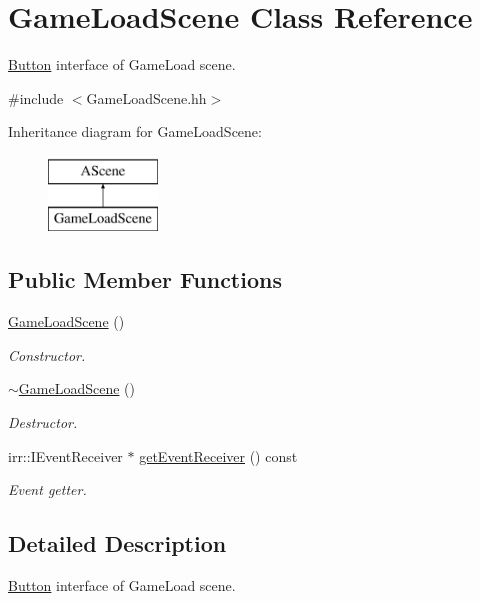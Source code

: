 \hypertarget{classGameLoadScene}{}\section{Game\+Load\+Scene Class Reference}
\label{classGameLoadScene}


\hyperlink{classButton}{Button} interface of Game\+Load scene.  




{\ttfamily \#include $<$Game\+Load\+Scene.\+hh$>$}

Inheritance diagram for Game\+Load\+Scene\+:\begin{figure}[H]
\begin{center}
\leavevmode
\includegraphics[height=2.000000cm]{classGameLoadScene}
\end{center}
\end{figure}
\subsection*{Public Member Functions}
\begin{DoxyCompactItemize}
\item 
\hyperlink{classGameLoadScene_a225786d3826577aa3743164b6262dc2b}{Game\+Load\+Scene} ()
\begin{DoxyCompactList}\small\item\em Constructor. \end{DoxyCompactList}\item 
\hyperlink{classGameLoadScene_a39c0f378455520c08d21e0642f35cd9b}{$\sim$\+Game\+Load\+Scene} ()
\begin{DoxyCompactList}\small\item\em Destructor. \end{DoxyCompactList}\item 
irr\+::\+I\+Event\+Receiver $\ast$ \hyperlink{classGameLoadScene_a81807790ad65bd2cf97a1e543cae2b74}{get\+Event\+Receiver} () const
\begin{DoxyCompactList}\small\item\em Event getter. \end{DoxyCompactList}\end{DoxyCompactItemize}


\subsection{Detailed Description}
\hyperlink{classButton}{Button} interface of Game\+Load scene. 

